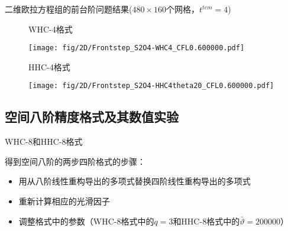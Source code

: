 \documentclass[aspectratio=169]{beamer}
\begin{document}
\begin{frame}{二维欧拉方程组的前台阶问题结果($480 \times 160$个网格，$t^{tem}=4$)}
  
  \vspace{-4mm}
  \begin{figure}[htbp]
    \centering
    
    \begin{multicols}{4}
      \begin{minipage}{0.25\textwidth}
        \vspace{0.1\textheight}
        \centerline{WHC-4格式}
      \end{minipage}
      \texttt{[image: fig/2D/Frontstep\_S2O4-WHC4\_CFL0.600000.pdf]}
    \end{multicols}
    
    \begin{multicols}{4}
      \begin{minipage}{0.25\textwidth}
        \vspace{0.14\textheight}
        \centerline{HHC-4格式}
      \end{minipage}
      \texttt{[image: fig/2D/Frontstep\_S2O4-HHC4theta20\_CFL0.600000.pdf]}
    \end{multicols}
  \end{figure}
  
\end{frame}

\subsection{空间八阶精度格式及其数值实验}

\begin{frame}{WHC-8和HHC-8格式}
  
  得到空间八阶的两步四阶格式的步骤：
  
  \begin{itemize}[<+->]
    \item 用从八阶线性重构导出的多项式替换四阶线性重构导出的多项式
    \item 重新计算相应的光滑因子
    \item 调整格式中的参数（WHC-8格式中的$q=3$和HHC-8格式中的$\bar\vartheta=200000$）
  \end{itemize}
  
\end{frame}
\end{document}
